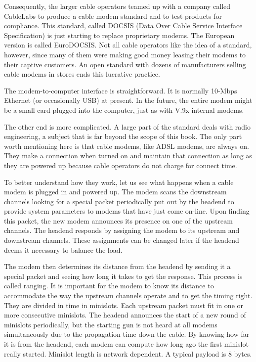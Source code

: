 Consequently, the larger cable operators teamed up with a company called
CableLabs to produce a cable modem standard and to test products for
compliance. This standard, called {DOCSIS} ({Data Over Cable Service
Interface Specification}) is just starting to replace proprietary
modems. The European version is called {EuroDOCSIS}. Not all cable
operators like the idea of a standard, however, since many of them were
making good money leasing their modems to their captive customers. An
open standard with dozens of manufacturers selling cable modems in
stores ends this lucrative practice.

The modem-to-computer interface is straightforward. It is normally
10-Mbps Ethernet (or occasionally USB) at present. In the future, the
entire modem might be a small card plugged into the computer, just as
with V.9x internal modems.

The other end is more complicated. A large part of the standard deals
with radio engineering, a subject that is far beyond the scope of this
book. The only part worth mentioning here is that cable modems, like
ADSL modems, are always on. They make a connection when turned on and
maintain that connection as long as they are powered up because cable
operators do not charge for connect time.

To better understand how they work, let us see what happens when a cable
modem is plugged in and powered up. The modem scans the downstream
channels looking for a special packet periodically put out by the
headend to provide system parameters to modems that have just come
on-line. Upon finding this packet, the new modem announces its presence
on one of the upstream channels. The headend responds by assigning the
modem to its upstream and downstream channels. These assignments can be
changed later if the headend deems it necessary to balance the load.

The modem then determines its distance from the headend by sending it a
special packet and seeing how long it takes to get the response. This
process is called {ranging}. It is important for the modem to know its
distance to accommodate the way the upstream channels operate and to get
the timing right. They are divided in time in {minislots}. Each upstream
packet must fit in one or more consecutive minislots. The headend
announces the start of a new round of minislots periodically, but the
starting gun is not heard at all modems simultaneously due to the
propagation time down the cable. By knowing how far it is from the
headend, each modem can compute how long ago the first minislot really
started. Minislot length is network dependent. A typical payload is 8
bytes.

